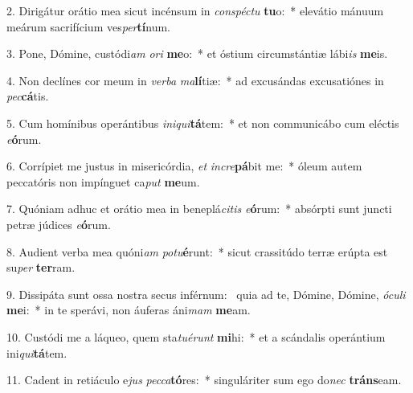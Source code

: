 2. Dirigátur orátio mea sicut incénsum in \textit{con}\textit{spéc}\textit{tu} \textbf{tu}o:~*  elevátio mánuum meárum sacrifícium ves\textit{per}\textbf{tí}num.\

3. Pone, Dómine, custódi\textit{am} \textit{o}\textit{ri} \textbf{me}o:~*  et óstium circumstántiæ lábi\textit{is} \textbf{me}is.\

4. Non declínes cor meum in \textit{ver}\textit{ba} \textit{ma}\textbf{lí}tiæ:~*  ad excusándas excusatiónes in \textit{pec}\textbf{cá}tis.\

5. Cum homínibus operántibus \textit{in}\textit{i}\textit{qui}\textbf{tá}tem:~*  et non communicábo cum eléctis \textit{e}\textbf{ó}rum.\

6. Corrípiet me justus in misericórdia, \textit{et} \textit{in}\textit{cre}\textbf{pá}bit me:~*  óleum autem peccatóris non impínguet ca\textit{put} \textbf{me}um.\

7. Quóniam adhuc et orátio mea in beneplá\textit{ci}\textit{tis} \textit{e}\textbf{ó}rum:~*  absórpti sunt juncti petræ júdices \textit{e}\textbf{ó}rum.\

8. Audient verba mea quóni\textit{am} \textit{pot}\textit{u}\textbf{é}runt:~*  sicut crassitúdo terræ erúpta est su\textit{per} \textbf{ter}ram.\

9. Dissipáta sunt ossa nostra secus inférnum: \dag\  quia ad te, Dómine, Dómine, \textit{ó}\textit{cu}\textit{li} \textbf{me}i:~*  in te sperávi, non áuferas áni\textit{mam} \textbf{me}am.\

10. Custódi me a láqueo, quem sta\textit{tu}\textit{é}\textit{runt} \textbf{mi}hi:~*  et a scándalis operántium ini\textit{qui}\textbf{tá}tem.\

11. Cadent in retiáculo e\textit{jus} \textit{pec}\textit{ca}\textbf{tó}res:~*  singuláriter sum ego do\textit{nec} \textbf{tráns}eam.\

